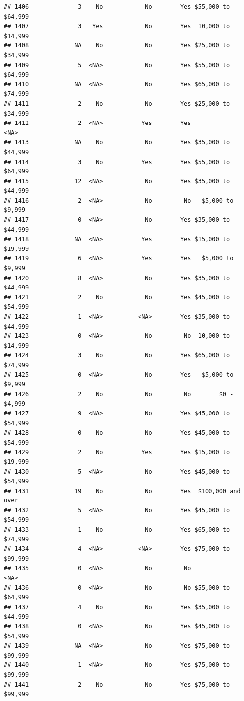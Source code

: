 \documentclass[man]{apa6}
\begin{document}
\begin{verbatim}
## 1406              3    No            No        Yes $55,000 to $64,999
## 1407              3   Yes            No        Yes  10,000 to $14,999
## 1408             NA    No            No        Yes $25,000 to $34,999
## 1409              5  <NA>            No        Yes $55,000 to $64,999
## 1410             NA  <NA>            No        Yes $65,000 to $74,999
## 1411              2    No            No        Yes $25,000 to $34,999
## 1412              2  <NA>           Yes        Yes               <NA>
## 1413             NA    No            No        Yes $35,000 to $44,999
## 1414              3    No           Yes        Yes $55,000 to $64,999
## 1415             12  <NA>            No        Yes $35,000 to $44,999
## 1416              2  <NA>            No         No   $5,000 to $9,999
## 1417              0  <NA>            No        Yes $35,000 to $44,999
## 1418             NA  <NA>           Yes        Yes $15,000 to $19,999
## 1419              6  <NA>           Yes        Yes   $5,000 to $9,999
## 1420              8  <NA>            No        Yes $35,000 to $44,999
## 1421              2    No            No        Yes $45,000 to $54,999
## 1422              1  <NA>          <NA>        Yes $35,000 to $44,999
## 1423              0  <NA>            No         No  10,000 to $14,999
## 1424              3    No            No        Yes $65,000 to $74,999
## 1425              0  <NA>            No        Yes   $5,000 to $9,999
## 1426              2    No            No         No        $0 - $4,999
## 1427              9  <NA>            No        Yes $45,000 to $54,999
## 1428              0    No            No        Yes $45,000 to $54,999
## 1429              2    No           Yes        Yes $15,000 to $19,999
## 1430              5  <NA>            No        Yes $45,000 to $54,999
## 1431             19    No            No        Yes  $100,000 and over
## 1432              5  <NA>            No        Yes $45,000 to $54,999
## 1433              1    No            No        Yes $65,000 to $74,999
## 1434              4  <NA>          <NA>        Yes $75,000 to $99,999
## 1435              0  <NA>            No         No               <NA>
## 1436              0  <NA>            No         No $55,000 to $64,999
## 1437              4    No            No        Yes $35,000 to $44,999
## 1438              0  <NA>            No        Yes $45,000 to $54,999
## 1439             NA  <NA>            No        Yes $75,000 to $99,999
## 1440              1  <NA>            No        Yes $75,000 to $99,999
## 1441              2    No            No        Yes $75,000 to $99,999

\end{verbatim}
\end{document}
